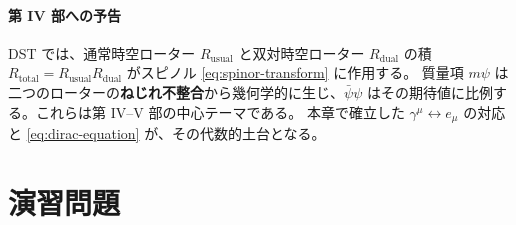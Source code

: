 \documentclass[dvipdfmx,a4paper,oneside]{jsbook}
\numberwithin{equation}{chapter}
\begin{document}
\paragraph{第 IV 部への予告}
DST では、通常時空ローター \(R_{\mathrm{usual}}\) と双対時空ローター \(R_{\mathrm{dual}}\) の積 \(R_{\mathrm{total}} = R_{\mathrm{usual}} R_{\mathrm{dual}}\) がスピノル \eqref{eq:spinor-transform} に作用する。
質量項 \(m\psi\) は二つのローターの\textbf{ねじれ不整合}から幾何学的に生じ、\(\bar\psi\psi\) はその期待値に比例する。これらは第 IV--V 部の中心テーマである。
本章で確立した \(\gamma^\mu \leftrightarrow e_\mu\) の対応と \eqref{eq:dirac-equation} が、その代数的土台となる。

\section*{演習問題}
\end{document}

